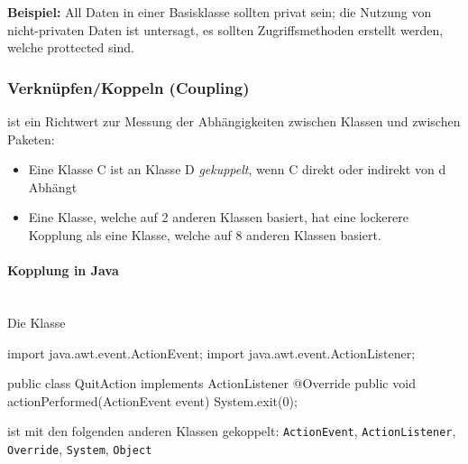 \documentclass[ngerman,color=3b]{tuda_summary}
\begin{document}
\textbf{Beispiel:} All Daten in einer Basisklasse sollten privat sein; die Nutzung von nicht-privaten Daten ist untersagt, es sollten Zugriffsmethoden erstellt werden, welche prottected sind.
\clearpage
\subsubsection{Verknüpfen/Koppeln (Coupling)}

\begin{definition}
    ist ein Richtwert zur Messung der Abhängigkeiten zwischen Klassen und zwischen Paketen:
    \begin{itemize}
        \item  Eine Klasse C ist an Klasse D \textit{gekuppelt}, wenn C direkt oder indirekt von d Abhängt
        \item  Eine Klasse, welche auf 2 anderen Klassen basiert, hat eine lockerere Kopplung als eine Klasse, welche auf 8 anderen Klassen basiert.
    \end{itemize}
\end{definition}

\paragraph{Kopplung in Java}\mbox{}\\
Die Klasse
\begin{codeBlock}[autogobble]{}
    import java.awt.event.ActionEvent;
    import java.awt.event.ActionListener;

    public class QuitAction implements ActionListener {
    	@Override
    	public void actionPerformed(ActionEvent event) {
    		System.exit(0);
    	}
    }
\end{codeBlock}
ist mit den folgenden anderen Klassen gekoppelt: \texttt{ActionEvent}, \texttt{ActionListener}, \texttt{Override}, \texttt{System}, \texttt{Object}
\end{document}
